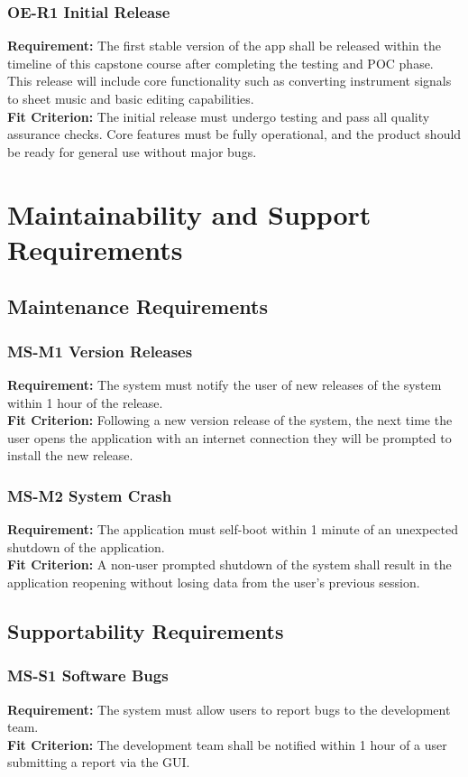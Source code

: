 \documentclass[12pt]{article}
\begin{document}
\subsubsection*{OE-R1 Initial Release}
\textbf{Requirement:} The first stable version of the app shall be released within the timeline of this capstone course after completing the testing and POC phase. This release will include core functionality such as converting instrument signals to sheet music and basic editing capabilities.\\
\textbf{Fit Criterion:} The initial release must undergo testing and pass all quality assurance checks. Core features must be fully operational, and the product should be ready for general use without major bugs.


\section{Maintainability and Support Requirements}
\subsection{Maintenance Requirements}
\subsubsection*{MS-M1 Version Releases}
\textbf{Requirement:} The system must notify the user of new releases of the system within 1 hour of the release. \\ 
\textbf{Fit Criterion:} Following a new version release of the system, the next time the user opens the application with an internet connection they will be prompted to install the new release. 
\subsubsection*{MS-M2 System Crash}
\textbf{Requirement:} The application must self-boot within 1 minute of an unexpected shutdown of the application. \\ 
\textbf{Fit Criterion:} A non-user prompted shutdown of the system shall result in the application reopening without losing data from the user’s previous session.

\subsection{Supportability Requirements}
\subsubsection*{MS-S1 Software Bugs}
\textbf{Requirement:} The system must allow users to report bugs to the development team. \\ 
\textbf{Fit Criterion:} The development team shall be notified within 1 hour of a user submitting a report via the GUI.
\end{document}
